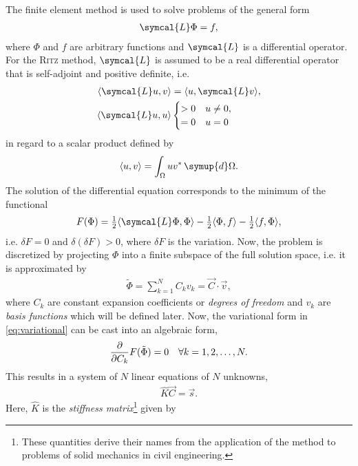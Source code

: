 The finite element method is used to solve problems of the general form
\begin{gather}
  \symcal{L} \Phi = f, \label{eq:fem}
\end{gather}
where $\Phi$ and $f$ are arbitrary functions and $\symcal{L}$ is a differential operator. For the \textsc{Ritz} method, $\symcal{L}$ is assumed to be a real differential operator that is self-adjoint and positive definite, i.e.
\begin{align}
  \langle \symcal{L} u, v \rangle &= \langle u, \symcal{L} v \rangle, \label{eq:self-adjoint} \\
  \langle \symcal{L} u, u \rangle & \begin{cases}
    > 0 & u \neq 0, \\
    = 0 & u = 0
  \end{cases} \label{eq:positive_definite}
\end{align}
in regard to a scalar product defined by
\begin{gather}
  \langle u, v \rangle = \int_{\Omega} u v^{*} \, \symup{d} \Omega. \label{eq:scalar_prod}
\end{gather}
The solution of the differential equation corresponds to the minimum of the functional
\begin{gather}
  F(\Phi) = \tfrac{1}{2} \langle \symcal{L} \Phi, \Phi \rangle - \tfrac{1}{2} \langle \Phi, f \rangle - \tfrac{1}{2} \langle f, \Phi \rangle, \label{eq:variational}
\end{gather}
i.e. $\delta F = 0$ and $\delta (\delta F) > 0$, where $\delta F$ is the variation. Now, the problem is discretized by projecting $\Phi$ into a finite subspace of the full solution space, i.e. it is approximated by
\begin{gather}
  \tilde{\Phi} = \sum_{k = 1}^{N} C_{k} v_{k} = \vec{C} \cdot \vec{v},
\end{gather}
where $C_{k}$ are constant expansion coefficients or \emph{degrees of freedom} and $v_{k}$ are \emph{basis functions} which will be defined later. Now, the variational form in \cref{eq:variational} can be cast into an algebraic form,
\begin{gather}
  \frac{\partial }{\partial C_{k}} F(\tilde{\Phi}) = 0 \quad \forall k = 1, 2, \dotsc, N.
\end{gather}
This results in a system of $N$ linear equations of $N$ unknowns,
\begin{gather}
  \hat{K} \vec{C} = \vec{s}. \label{eq:ritz}
\end{gather}
Here, $\hat{K}$ is the \emph{stiffness matrix}\footnote{\label{fn:zienkiewicz}These quantities derive their names from the application of the method to problems of solid mechanics in civil engineering.} given by
